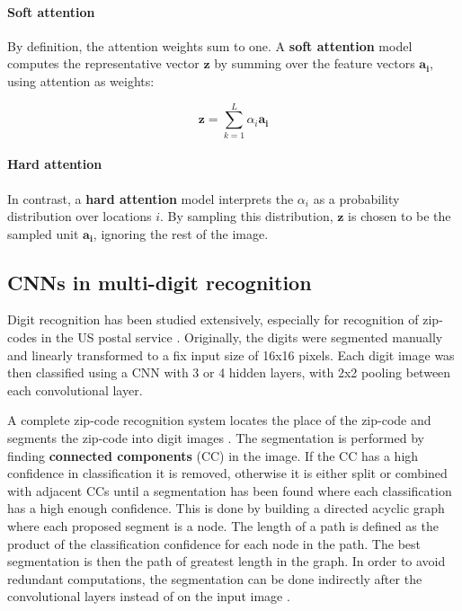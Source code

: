 \paragraph{Soft attention}
By definition, the attention weights sum to one. A \textbf{soft attention} model computes the representative vector $\mathbf{z}$ by summing over the feature vectors $\mathbf{a_i}$, using attention as weights:

\[
\mathbf{z} = \sum_{k=1}^L \alpha_i \mathbf{a_i}
\]

\paragraph{Hard attention}
In contrast, a \textbf{hard attention} model interprets the ${\alpha_i}$ as a probability distribution over locations $i$. By sampling this distribution, $\mathbf{z}$ is chosen to be the sampled unit $\mathbf{a_i}$, ignoring the rest of the image.


\subsection{CNNs in multi-digit recognition}

Digit recognition has been studied extensively, especially for recognition of zip-codes in the US postal service \cite{lecun_1989, lecun_1990}. Originally, the digits were segmented manually and linearly transformed to a fix input size of 16x16 pixels.
Each digit image was then classified using a CNN with 3 or 4 hidden layers, with 2x2 pooling between each convolutional layer.

A complete zip-code recognition system locates the place of the zip-code and segments the zip-code into digit images \cite{zipcode_system}. The segmentation is performed by finding \textbf{connected components} (CC) in the image. If the CC has a high confidence in classification it is removed, otherwise it is either split or combined with adjacent CCs until a segmentation has been found where each classification has a high enough confidence. This is done by building a directed acyclic graph where each proposed segment is a node. The length of a path is defined as the product of the classification confidence for each node in the path. The best segmentation is then the path of greatest length in the graph. In order to avoid redundant computations, the segmentation can be done indirectly after the convolutional layers instead of on the input image \cite{lecun_multidigit}.

